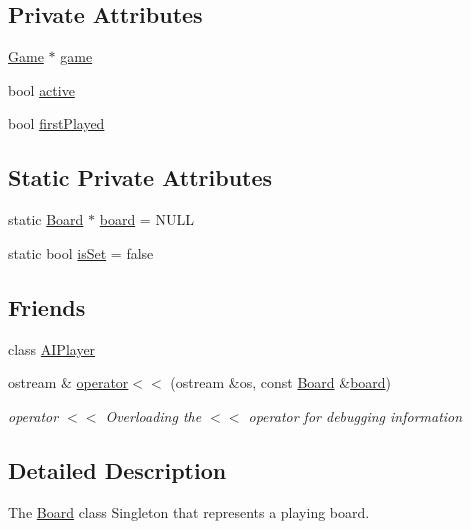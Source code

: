 \subsection*{Private Attributes}
\begin{DoxyCompactItemize}
\item 
\hyperlink{class_game}{Game} $\ast$ \hyperlink{class_board_ac846e6a4ffe6621894ff8738ea59549e}{game}
\item 
bool \hyperlink{class_board_a4dde45cdfd5aac960628f55106179ba4}{active}
\item 
bool \hyperlink{class_board_aa360f3725c638c933beb5d3e3cd881d7}{first\-Played}
\end{DoxyCompactItemize}
\subsection*{Static Private Attributes}
\begin{DoxyCompactItemize}
\item 
static \hyperlink{class_board}{Board} $\ast$ \hyperlink{class_board_a0a25d2a46017652371e29fa8c8dd4544}{board} = N\-U\-L\-L
\item 
static bool \hyperlink{class_board_a6862f6207a47592cd5807f08e8d6564b}{is\-Set} = false
\end{DoxyCompactItemize}
\subsection*{Friends}
\begin{DoxyCompactItemize}
\item 
class \hyperlink{class_board_a2c11a076a909acd936d897cd2a81f931}{A\-I\-Player}
\item 
ostream \& \hyperlink{class_board_ad799faa7c15b047d09f3fa52406c95d5}{operator$<$$<$} (ostream \&os, const \hyperlink{class_board}{Board} \&\hyperlink{class_board_a0a25d2a46017652371e29fa8c8dd4544}{board})
\begin{DoxyCompactList}\small\item\em operator $<$$<$ Overloading the $<$$<$ operator for debugging information \end{DoxyCompactList}\end{DoxyCompactItemize}


\subsection{Detailed Description}
The \hyperlink{class_board}{Board} class Singleton that represents a playing board. 

